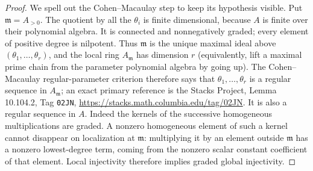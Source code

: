 \begin{proof}
We spell out the Cohen--Macaulay step to keep its hypothesis visible.
Put $\mathfrak m=A_{>0}$. The quotient by all the $\theta_i$ is
finite dimensional, because $A$ is finite over their polynomial
algebra. It is connected and nonnegatively graded; every element of
positive degree is nilpotent. Thus $\mathfrak m$ is the unique maximal
ideal above $(\theta_1,\ldots,\theta_r)$, and the local ring
$A_{\mathfrak m}$ has dimension $r$ (equivalently, lift a maximal
prime chain from the parameter polynomial algebra by going up).
The Cohen--Macaulay regular-parameter criterion therefore says that
$\theta_1,\ldots,\theta_r$ is a regular sequence in $A_{\mathfrak m}$;
an exact primary reference is the Stacks Project,
Lemma 10.104.2, Tag \texttt{02JN},
\url{https://stacks.math.columbia.edu/tag/02JN}.
It is also a regular sequence in $A$. Indeed the kernels of the
successive homogeneous multiplications are graded. A nonzero
homogeneous element of such a kernel cannot disappear on localization
at $\mathfrak m$: multiplying it by an element outside $\mathfrak m$
has a nonzero lowest-degree term, coming from the nonzero scalar
constant coefficient of that element. Local injectivity therefore
implies graded global injectivity.


\end{proof}

